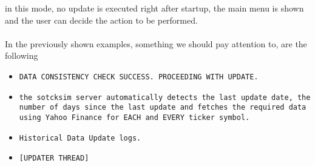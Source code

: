 in this mode, no update is executed right after startup, the main menu is shown
and the user can decide the action to be performed.\\
\\
In the previously shown examples, something we should pay attention to, are the
following
\begin{itemize}
    \item \texttt{DATA CONSISTENCY CHECK SUCCESS. PROCEEDING WITH UPDATE.}
    \item \texttt{the sotcksim server automatically detects the last update
    date, the number of days since the last update and fetches the required
    data using Yahoo Finance for EACH and EVERY ticker symbol.}
    \item \texttt{Historical Data Update logs.}
    \item \texttt{[UPDATER THREAD]}
\end{itemize}
